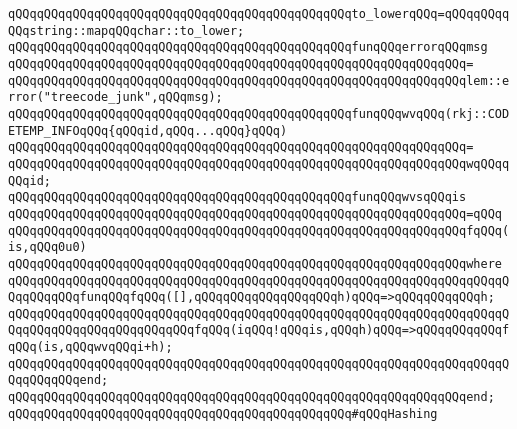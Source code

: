\verb|qQQqqQQqqQQqqQQqqQQqqQQqqQQqqQQqqQQqqQQqqQQqqQQqto_lowerqQQq=qQQqqQQqqQQqstring::mapqQQqchar::to_lower;|\newline
\newline
\verb|qQQqqQQqqQQqqQQqqQQqqQQqqQQqqQQqqQQqqQQqqQQqqQQqfunqQQqerrorqQQqmsg|\newline
\verb|qQQqqQQqqQQqqQQqqQQqqQQqqQQqqQQqqQQqqQQqqQQqqQQqqQQqqQQqqQQqqQQq=|\newline
\verb|qQQqqQQqqQQqqQQqqQQqqQQqqQQqqQQqqQQqqQQqqQQqqQQqqQQqqQQqqQQqqQQqlem::error("treecode_junk",qQQqmsg);|\newline
\newline
\verb|qQQqqQQqqQQqqQQqqQQqqQQqqQQqqQQqqQQqqQQqqQQqqQQqfunqQQqwvqQQq(rkj::CODETEMP_INFOqQQq{qQQqid,qQQq...qQQq}qQQq)|\newline
\verb|qQQqqQQqqQQqqQQqqQQqqQQqqQQqqQQqqQQqqQQqqQQqqQQqqQQqqQQqqQQqqQQq=|\newline
\verb|qQQqqQQqqQQqqQQqqQQqqQQqqQQqqQQqqQQqqQQqqQQqqQQqqQQqqQQqqQQqqQQqwqQQqqQQqid;|\newline
\newline
\verb|qQQqqQQqqQQqqQQqqQQqqQQqqQQqqQQqqQQqqQQqqQQqqQQqfunqQQqwvsqQQqis|\newline
\verb|qQQqqQQqqQQqqQQqqQQqqQQqqQQqqQQqqQQqqQQqqQQqqQQqqQQqqQQqqQQqqQQq=qQQq|\newline
\verb|qQQqqQQqqQQqqQQqqQQqqQQqqQQqqQQqqQQqqQQqqQQqqQQqqQQqqQQqqQQqqQQqfqQQq(is,qQQq0u0)|\newline
\verb|qQQqqQQqqQQqqQQqqQQqqQQqqQQqqQQqqQQqqQQqqQQqqQQqqQQqqQQqqQQqqQQqwhere|\newline
\verb|qQQqqQQqqQQqqQQqqQQqqQQqqQQqqQQqqQQqqQQqqQQqqQQqqQQqqQQqqQQqqQQqqQQqqQQqqQQqqQQqfunqQQqfqQQq([],qQQqqQQqqQQqqQQqqQQqh)qQQq=>qQQqqQQqqQQqh;|\newline
\verb|qQQqqQQqqQQqqQQqqQQqqQQqqQQqqQQqqQQqqQQqqQQqqQQqqQQqqQQqqQQqqQQqqQQqqQQqqQQqqQQqqQQqqQQqqQQqqQQqfqQQq(iqQQq!qQQqis,qQQqh)qQQq=>qQQqqQQqqQQqfqQQq(is,qQQqwvqQQqi+h);|\newline
\verb|qQQqqQQqqQQqqQQqqQQqqQQqqQQqqQQqqQQqqQQqqQQqqQQqqQQqqQQqqQQqqQQqqQQqqQQqqQQqqQQqend;|\newline
\newline
\verb|qQQqqQQqqQQqqQQqqQQqqQQqqQQqqQQqqQQqqQQqqQQqqQQqqQQqqQQqqQQqqQQqend;|\newline
\newline
\newline
\verb|qQQqqQQqqQQqqQQqqQQqqQQqqQQqqQQqqQQqqQQqqQQqqQQq#qQQqHashing|\newline
\newline
